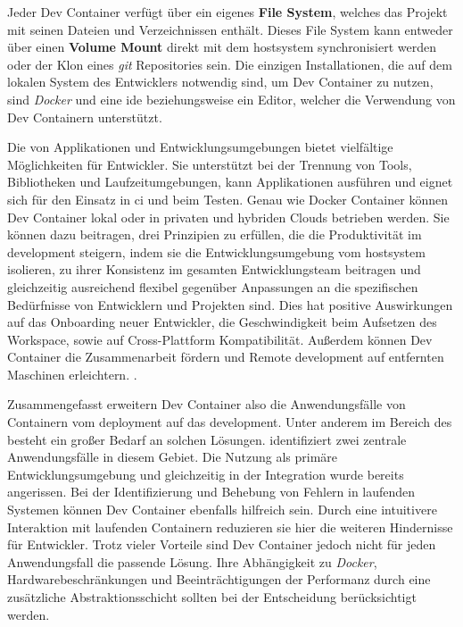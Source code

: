 Jeder Dev Container verfügt über ein eigenes \textbf{File System}, welches das Projekt mit seinen Dateien und Verzeichnissen enthält. Dieses File System kann entweder über einen \textbf{Volume Mount} direkt mit dem \Gls{hostsystem} synchronisiert werden oder der Klon eines \textit{\Gls{git}} Repositories sein. Die einzigen Installationen, die auf dem lokalen System des Entwicklers notwendig sind, um Dev Container zu nutzen, sind \textit{Docker} und eine \Gls{ide} beziehungsweise ein Editor, welcher die Verwendung von Dev Containern unterstützt.

Die  von Applikationen und Entwicklungsumgebungen bietet vielfältige Möglichkeiten für Entwickler. Sie unterstützt bei der Trennung von Tools, Bibliotheken und Laufzeitumgebungen, kann Applikationen ausführen und eignet sich für den Einsatz in \acrfull{ci} und beim Testen. Genau wie Docker Container können Dev Container lokal oder in privaten und hybriden Clouds betrieben werden. \cite{306:Development-Containers} Sie können dazu beitragen, drei Prinzipien zu erfüllen, die die Produktivität im \Gls{development} steigern, indem sie die Entwicklungsumgebung vom \Gls{hostsystem} isolieren, zu ihrer Konsistenz im gesamten Entwicklungsteam beitragen und gleichzeitig ausreichend flexibel gegenüber Anpassungen an die spezifischen Bedürfnisse von Entwicklern und Projekten sind. Dies hat positive Auswirkungen auf das Onboarding neuer Entwickler, die Geschwindigkeit beim Aufsetzen des Workspace, sowie auf Cross-Plattform Kompatibilität. Außerdem können Dev Container die Zusammenarbeit fördern und Remote \Gls{development} auf entfernten Maschinen erleichtern. \cite{200:Dev-Containers-Future-of-Development-Environments,202:Maximizing-Efficiency-with-Dev-Containers,305:Using-DevContainers-in-JetBrains-IDEs}.

Zusammengefasst erweitern Dev Container also die Anwendungsfälle von Containern vom \Gls{deployment} auf das \Gls{development}. Unter anderem im Bereich des  besteht ein großer Bedarf an solchen Lösungen. \citeauthor{202:Maximizing-Efficiency-with-Dev-Containers} identifiziert zwei zentrale Anwendungsfälle in diesem Gebiet. Die Nutzung als primäre Entwicklungsumgebung und gleichzeitig in der Integration wurde bereits angerissen. Bei der Identifizierung und Behebung von Fehlern in laufenden Systemen können Dev Container ebenfalls hilfreich sein. Durch eine intuitivere Interaktion mit laufenden Containern reduzieren sie hier die weiteren Hindernisse für Entwickler. Trotz vieler Vorteile sind Dev Container jedoch nicht für jeden Anwendungsfall die passende Lösung. Ihre Abhängigkeit zu \textit{Docker}, Hardwarebeschränkungen und Beeinträchtigungen der Performanz durch eine zusätzliche Abstraktionsschicht sollten bei der Entscheidung berücksichtigt werden. \cite{202:Maximizing-Efficiency-with-Dev-Containers}

